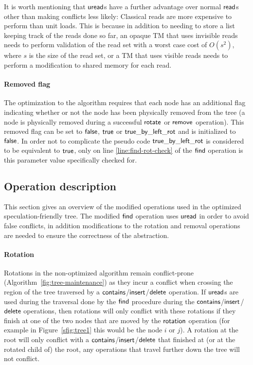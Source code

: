It is worth mentioning that $\act{uread}$s have a further advantage over normal $\act{read}$s other than making conflicts less likely:
Classical reads are more expensive to perform than unit loads.
This is because in addition to needing to store a list keeping track of the reads done so far, 
an opaque TM that uses invisible reads needs to perform validation of the read set with a worst case cost of 
$O(s^2)$,
where $s$ is the size of the read set, or a TM that uses visible reads needs to perform a modification to shared memory for each read.


\paragraph{Removed flag}
The optimization to the algorithm requires that each node has an additional flag indicating whether or not the 
node has been physically removed from the tree (a node is physically removed during a successful $\act{rotate}$ or $\act{remove}$ operation).
This removed flag can be set to $\lit{false}$, $\lit{true}$ or $\lit{true\_by\_left\_rot}$ and is initialized to $\lit{false}$.
In order not to complicate the pseudo code $\lit{true\_by\_left\_rot}$ is considered to be equivalent to $\lit{true}$, only on line \ref{line:find-rot-check} of the $\act{find}$ operation is this
parameter value specifically checked for.


\subsection{Operation description}
This section gives an overview of the modified operations used in the optimized speculation-friendly tree.
The modified $\act{find}$ operation uses $\act{uread}$ in order to avoid false conflicts, in addition
modifications to the rotation and removal operations are needed to ensure the correctness of the abstraction.

\paragraph{Rotation}

Rotations in the non-optimized algorithm remain conflict-prone (Algorithm~\ref{fig:tree-maintenance}) as they incur a conflict when crossing the region of the tree traversed by a  $\act{contains}$/$\act{insert}$/$\act{delete}$ operation. 
If $\act{uread}$s are used during the traversal done by the $\act{find}$ procedure during the $\act{contains}$/$\act{insert}$/$\act{delete}$ operations, then rotations will only conflict with these rotations if they
finish at one of the two nodes that are moved by the $\act{rotation}$ operation
(for example in Figure~\ref{sfig:tree1} this would be the node $i$ or $j$).
A rotation at the root will only conflict with a $\act{contains}$/$\act{insert}$/$\act{delete}$ that finished at (or at the rotated child of) the root, any operations that travel further down the tree will not conflict.

